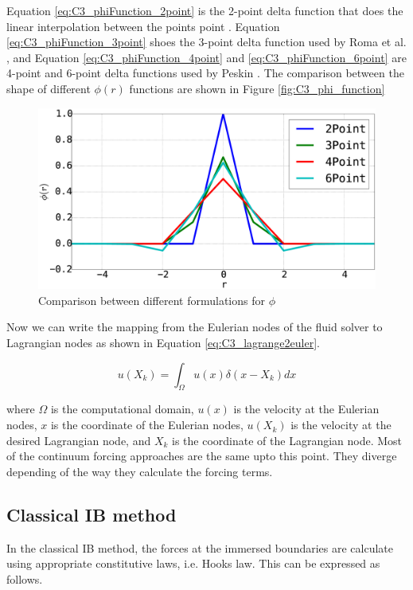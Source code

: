 Equation \eqref{eq:C3_phiFunction_2point} is the 2-point delta function that does the linear interpolation between the points point \cite{saiki1996numerical}. Equation \eqref{eq:C3_phiFunction_3point} shoes the 3-point delta function used by Roma et al. \cite{roma1999adaptive}, and Equation \eqref{eq:C3_phiFunction_4point} and \eqref{eq:C3_phiFunction_6point} are 4-point and 6-point delta functions used by Peskin \cite{peskin2002immersed}. The comparison between the shape of different $\phi(r)$ functions are shown in Figure \ref{fig:C3_phi_function}

\begin{figure}
	\centering
	\includegraphics[width=14.cm]{Chapter_3/figure/phi_function.eps}
	\caption{Comparison between different formulations for $\phi$}
\end{figure}

Now we can write the mapping from the Eulerian nodes of the fluid solver to Lagrangian nodes as shown in Equation \eqref{eq:C3_lagrange2euler}.

\begin{equation}\label{eq:C3_lagrange2euler}
	u(X_k) = \int_\Omega u(x) \delta(x - X_k) dx
\end{equation}

where $\Omega$ is the computational domain, $u(x)$ is the velocity at the Eulerian nodes, $x$ is the coordinate of the Eulerian nodes, $u(X_k)$ is the velocity at the desired Lagrangian node, and $X_k$ is the coordinate of the Lagrangian node. Most of the continuum forcing approaches are the same upto this point. They diverge depending of the way they calculate the forcing terms.

\subsection{Classical IB method}
In the classical IB method, the forces at the immersed boundaries are calculate using appropriate constitutive laws, i.e. Hooks law. This can be expressed as follows.

